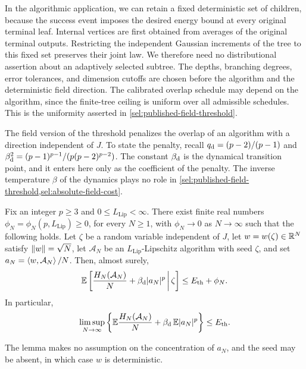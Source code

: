In the algorithmic application, we can retain a fixed deterministic set of children, because the success event imposes the desired energy bound
at every original terminal leaf. Internal vertices are first obtained
from averages of the original terminal outputs. Restricting the independent Gaussian increments of the tree to this fixed
set preserves their joint law. We therefore need no distributional assertion
about an adaptively selected subtree. The depths, branching degrees, error
tolerances, and dimension cutoffs are chosen before the algorithm and the
deterministic field direction. The calibrated overlap schedule may depend on the algorithm,
since the finite-tree ceiling is uniform over all admissible schedules.
This is the uniformity asserted in \cref{sel:published-field-threshold}.

The field version of the threshold penalizes the overlap of an algorithm
with a direction independent of $J$. To state the penalty, recall
$q_{\mathrm d}=(p-2)/(p-1)$ and $\beta_{\mathrm d}^2=(p-1)^{p-1}/(p(p-2)^{p-2})$. The constant $\beta_{\mathrm d}$
is the dynamical transition point, and it enters here only as the
coefficient of the penalty. The inverse temperature $\beta$ of the dynamics
plays no role in \cref{sel:published-field-threshold,sel:absolute-field-cost}.

\begin{lemma}\label{sel:absolute-field-cost}
Fix an integer $p\ge3$ and $0\le L_{\mathrm{Lip}}<\infty$. There exist
finite real numbers $\phi_N=\phi_N(p,L_{\mathrm{Lip}})\ge0$, for every $N\ge1$,
with $\phi_N\to0$ as $N\to\infty$
such that the following holds. Let $\zeta$ be a random variable independent of $J$, let
$w=w(\zeta)\in\mathbb R^N$ satisfy $\lVert w\rVert=\sqrt N$, let $\mathcal A_N$ be an
$L_{\mathrm{Lip}}$-Lipschitz algorithm with seed $\zeta$, and set
$a_N=\left\langle w,\mathcal A_N\right\rangle/N$. Then, almost surely,
\begin{equation}\label{eq:conditional-field-cost}
 \mathbb E\left[\frac{H_N(\mathcal A_N)}N+\beta_{\mathrm d}|a_N|^p\,\middle|\,\zeta\right]
 \le E_{\mathrm{th}}+\phi_N.
\end{equation}
In particular,
\begin{equation}\label{sel:absolute-field-cost-equation}
 \limsup_{N\to\infty}
 \left\{\mathbb E\frac{H_N(\mathcal A_N)}N+\beta_{\mathrm d}\,\mathbb E|a_N|^p\right\}\le E_{\mathrm{th}}.
\end{equation}
\end{lemma}

The lemma makes no assumption on the concentration of $a_N$, and the seed
may be absent, in which case $w$ is deterministic.

